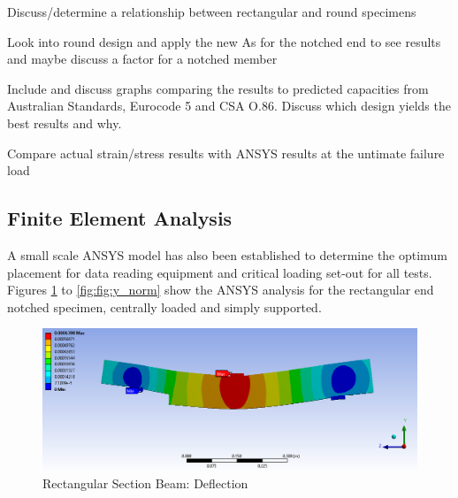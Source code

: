 \documentclass[11pt,a4paper]{article}
\numberwithin{equation}{subsection}
\begin{document}
\vspace*{\baselineskip}
\noindent Discuss/determine a relationship between rectangular and round specimens\par

\vspace*{\baselineskip}
\noindent Look into round design and apply the new As for the notched end to see results and maybe discuss a factor for a notched member\par

\vspace*{\baselineskip}
\noindent Include and discuss graphs comparing the results to predicted capacities from Australian Standards, Eurocode 5 and CSA O.86. Discuss which design yields the best results and why. \par

\vspace*{\baselineskip}
\noindent Compare actual strain/stress results with ANSYS results at the untimate failure load\par

\pagebreak	

\subsection{Finite Element Analysis}
\noindent
A small scale ANSYS model has also been established to determine the optimum placement for data reading equipment and critical loading set-out for all tests. Figures \ref{fig:Def} to \ref{fig:fig:y_norm} show the ANSYS analysis for the rectangular end notched specimen, centrally loaded and simply supported.

\vspace*{\baselineskip}

\begin{figure}[h]
	\begin{center}
		\includegraphics[scale=0.45]{Ansys_Deflection}
	\end{center}
	
	\caption{Rectangular Section Beam: Deflection}
	\label{fig:Def}
\end{figure}
\pagebreak
\end{document}
